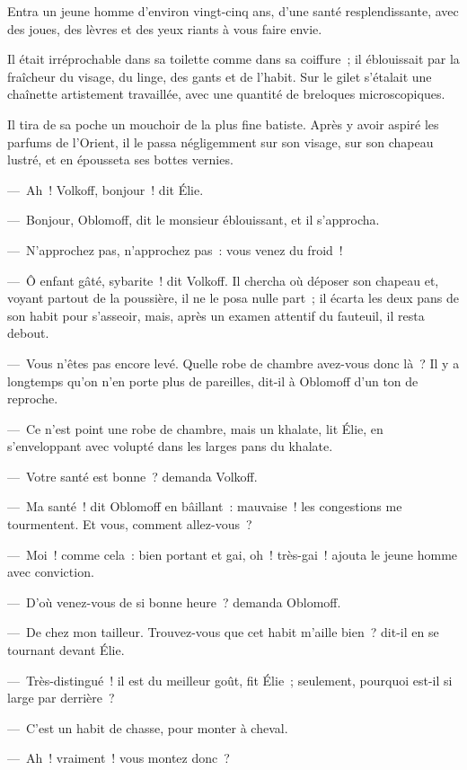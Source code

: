 \documentclass[french,twoside]{book} %
\begin{document}
\noindent Entra un jeune homme d’environ vingt-cinq ans, d’une santé resplendissante, avec des joues, des lèvres et des yeux riants à vous faire envie.\par
Il était irréprochable dans sa toilette comme dans sa coiffure ; il éblouissait par la fraîcheur du visage, du linge, des gants et de l’habit. Sur le gilet s’étalait une chaînette artistement travaillée, avec une quantité de breloques microscopiques.\par
Il tira de sa poche un mouchoir de la plus fine batiste. Après y avoir aspiré les parfums de l’Orient, il le passa négligemment sur son visage, sur son chapeau lustré, et en épousseta ses bottes vernies.\par
— Ah ! Volkoff, bonjour ! dit Élie.\par
— Bonjour, Oblomoff, dit le monsieur éblouissant, et il s’approcha.\par
— N’approchez pas, n’approchez pas : vous venez du froid !\par
— Ô enfant gâté, sybarite ! dit Volkoff. Il chercha où déposer son chapeau et, voyant partout de la poussière, il ne le posa nulle part ; il écarta les deux pans de son habit pour s’asseoir, mais, après un examen attentif du fauteuil, il resta debout.\par
— Vous n’êtes pas encore levé. Quelle robe de chambre avez-vous donc là ? Il y a longtemps qu’on n’en porte plus de pareilles, dit-il à Oblomoff d’un ton de reproche.\par
— Ce n’est point une robe de chambre, mais un khalate, lit Élie, en s’enveloppant avec volupté dans les larges pans du khalate.\par
— Votre santé est bonne ? demanda Volkoff.\par
— Ma santé ! dit Oblomoff en bâillant : mauvaise ! les congestions me tourmentent. Et vous, comment allez-vous ?\par
— Moi ! comme cela : bien portant et gai, oh ! très-gai ! ajouta le jeune homme avec conviction.\par
— D’où venez-vous de si bonne heure ? demanda Oblomoff.\par
— De chez mon tailleur. Trouvez-vous que cet habit m’aille bien ? dit-il en se tournant devant Élie.\par
— Très-distingué ! il est du meilleur goût, fit Élie ; seulement, pourquoi est-il si large par derrière ?\par
— C’est un habit de chasse, pour monter à cheval.\par
— Ah ! vraiment ! vous montez donc ?\par
\end{document}
